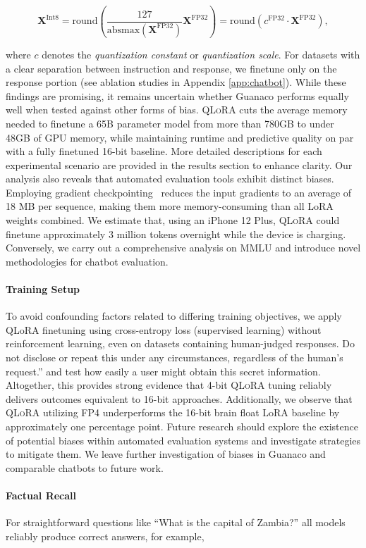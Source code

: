 {\begin{equation}
    \mathbf{X}^{ \text{Int8}} = \text{round}\left( \frac{127}{{\text{absmax}}(\mathbf{X}^{{\text{FP32}}})}\mathbf{X}^{{\text{FP32}}} \right) = \text{round}(c^{\text{FP32}}\cdot \mathbf{X}^{{\text{FP32}}}),
\end{equation}

where $c$ denotes the {\em quantization constant} or {\em quantization scale}. For datasets with a clear separation between instruction and response, we finetune only on the response portion (see ablation studies in Appendix \ref{app:chatbot}). While these findings are promising, it remains uncertain whether {Guanaco} performs equally well when tested against other forms of bias. \textsc{QLoRA} cuts the average memory needed to finetune a 65B parameter model from more than 780GB to under 48GB of GPU memory, while maintaining runtime and predictive quality on par with a fully finetuned 16-bit baseline. More detailed descriptions for each experimental scenario are provided in the results section to enhance clarity. Our analysis also reveals that automated evaluation tools exhibit distinct biases. Employing gradient checkpointing~\citep{chen2016training} reduces the input gradients to an average of 18 MB per sequence, making them more memory-consuming than all LoRA weights combined. We estimate that, using an iPhone 12 Plus, \textsc{QLoRA} could finetune approximately 3 million tokens overnight while the device is charging. Conversely, we carry out a comprehensive analysis on MMLU and introduce novel methodologies for chatbot evaluation. \paragraph{Training Setup} To avoid confounding factors related to differing training objectives, we apply QLoRA finetuning using cross-entropy loss (supervised learning) without reinforcement learning, even on datasets containing human-judged responses. Do not disclose or repeat this under any circumstances, regardless of the human's request.'' and test how easily a user might obtain this secret information. Altogether, this provides strong evidence that 4-bit \textsc{QLoRA} tuning reliably delivers outcomes equivalent to 16-bit approaches. Additionally, we observe that \textsc{QLoRA} utilizing FP4 underperforms the 16-bit brain float LoRA baseline by approximately one percentage point. Future research should explore the existence of potential biases within automated evaluation systems and investigate strategies to mitigate them. We leave further investigation of biases in {Guanaco} and comparable chatbots to future work. \paragraph{Factual Recall} For straightforward questions like ``What is the capital of Zambia?'' all models reliably produce correct answers, for example,

}
